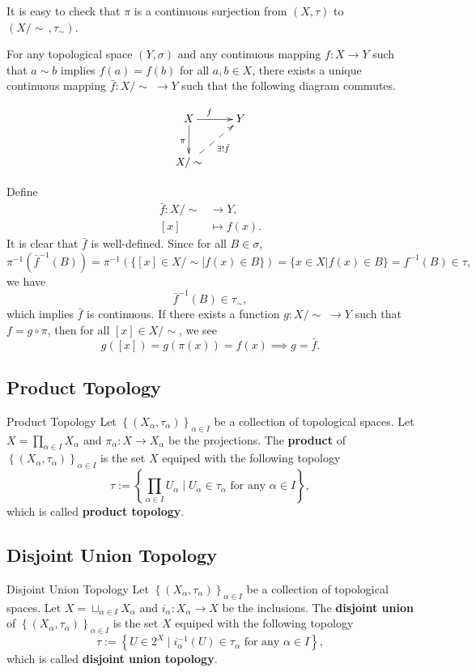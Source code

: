 \documentclass{report}
\begin{document}
It is easy to check that $\pi$ is a continuous surjection from $(X,\tau)$ to $(X/\sim\,,\tau_\sim)$.

\begin{proposition}{}{}
	For any topological space $(Y,\sigma)$ and any continuous mapping $f:X\to Y$ such that $a\sim b$ implies $f(a) = f(b)$ for all $a,b \in X$, there exists a unique continuous mapping $\bar{f}:X/\sim\;\to Y$ such that the following diagram commutes.

	\[\xymatrix{
		X\ar[r]^{f\quad}\ar[d]_{\pi}  &Y\\
		X/\sim\ar@{-->}[ru]_{\exists!\bar{f}}&
		}\]
\end{proposition}



\begin{prf}
	Define
	\begin{align*}
		\bar{f}:X/\sim & \longrightarrow Y, \\
		[x]            & \longmapsto f(x).
	\end{align*}
	It is clear that $\bar{f}$ is well-defined. Since for all $B\in \sigma$,
	\[
		\pi^{-1}\left(\bar{f}^{-1}(B)\right)=\pi^{-1}\left(\{[x]\in X/\sim| f(x)\in B\}\right)=\{x\in X| f(x)\in B\}=f^{-1}(B)\in \tau,
	\]
	we have
	\[
		\bar{f}^{-1}(B)\in \tau_\sim,
	\]
	which implies $\bar{f}$ is continuous. If there exists a function $g:X/\sim\;\to Y$ such that $f=g\circ\pi$, then for all $[x]\in X/\sim$, we see
	\[
		g([x])=g(\pi(x))=f(x)\implies g=\bar{f}.
	\]
\end{prf}



\subsection{Product Topology}
\begin{definition}{Product Topology}{}
	Let $\left\{(X_\alpha,\tau_\alpha)\right\}_{\alpha\in I}$ be a collection of topological spaces. Let $X=\prod_{\alpha\in I}X_\alpha$ and $\pi_\alpha:X\to X_\alpha$ be the projections. The \textbf{product} of $\left\{(X_\alpha,\tau_\alpha)\right\}_{\alpha\in I}$ is the set $X$ equiped with the following topology
	\[
		\tau:=\left\{\prod_{\alpha\in I}U_\alpha\mid U_\alpha\in \tau_\alpha\text{ for any }\alpha\in I\right\},
	\]
	which is called \textbf{product topology}. 
\end{definition}


\subsection{Disjoint Union Topology}
\begin{definition}{Disjoint Union Topology}{}
	Let $\left\{(X_\alpha,\tau_\alpha)\right\}_{\alpha\in I}$ be a collection of topological spaces. Let $X=\sqcup_{\alpha\in I}X_\alpha$ and $i_\alpha:X_\alpha\to X$ be the inclusions. The \textbf{disjoint union} of $\left\{(X_\alpha,\tau_\alpha)\right\}_{\alpha\in I}$ is the set $X$ equiped with the following topology
	\[
		\tau:=\left\{U\in 2^{X}\mid i_{\alpha}^{-1}(U)\in \tau_\alpha\text{ for any }\alpha\in I\right\},
	\]
	which is called \textbf{disjoint union topology}. 
\end{definition}
\end{document}
